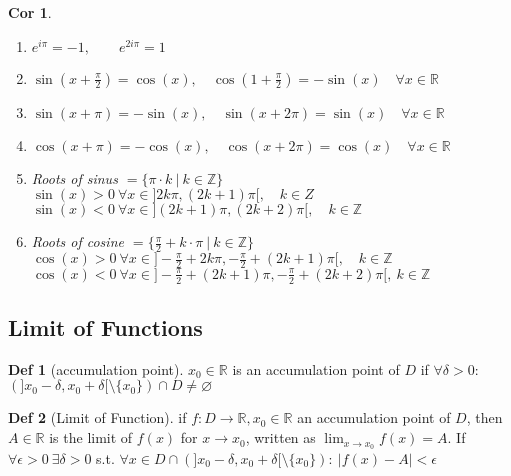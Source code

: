 \documentclass[a4paper, 10pt]{article}
\newtheorem*{corollary}{Cor}
\theoremstyle{definition}
\newtheorem*{definition}{Def}
\theoremstyle{named}
\newcommand{\R}{\mathbb{R}}
\newcommand{\Z}{\mathbb{Z}}
\begin{document}
\begin{corollary}
    \begin{enumerate}
        \item $e^{i\pi}=-1, \qquad e^{2i\pi}=1$
        \item $\sin(x+\frac{\pi}{2}) = \cos(x), \quad \cos(1+\frac{\pi}{2}) = -\sin(x) \quad \forall x \in \R$
        \item $\sin(x+\pi)=-\sin(x), \quad \sin(x+2\pi) = \sin(x) \quad \forall x \in \R$
        \item $\cos(x+\pi) = -\cos(x), \quad \cos(x+2\pi) = \cos(x) \quad \forall x \in \R$
        \item Roots of sinus $= \{\pi \cdot k \ | \ k \in \Z \}$ \\ 
        $\sin(x) > 0 \ \forall x \in ] 2k \pi, (2k + 1)\pi [, \quad k \in Z$ \\
        $\sin(x) < 0 \ \forall x \in ] (2k + 1)\pi, (2k + 2) \pi [, \quad k \in \Z$
        \item Roots of cosine $= \{\frac{\pi}{2} + k \cdot \pi \ | \ k \in \Z \}$ \\
        $\cos(x) > 0 \ \forall x \in ] - \frac{\pi}{2} + 2k \pi, - \frac{\pi}{2} + (2k + 1)\pi [, \quad k \in \Z$ \\
        $\cos(x) < 0 \ \forall x \in ] -\frac{\pi}{2} + (2k + 1) \pi, - \frac{\pi}{2} + (2k + 2) \pi [, \ k \in \Z$
    \end{enumerate}
\end{corollary}

\subsection{Limit of Functions}
\begin{definition}[accumulation point]
    $x_0 \in \R$ is an accumulation point of $D$ if $\forall \delta > 0$: $(]x_0 - \delta, x_0 + \delta[ \setminus \{x_0\}) \cap D \neq \varnothing$
\end{definition}

\begin{definition}[Limit of Function]
    if $f : D \to \R, x_0 \in \R$ an accumulation point of $D$, then $A \in \R$ is the limit of $f(x)$ for $x \to x_0$, written as $\lim_{x \to x_0} f(x) = A$. If $\forall \epsilon > 0 \ \exists \delta > 0$ s.t. $\forall x \in D \cap (]x_0 - \delta, x_0 + \delta[ \setminus \{x_0\}): \ |f(x) - A| < \epsilon$
\end{definition}
\end{document}
